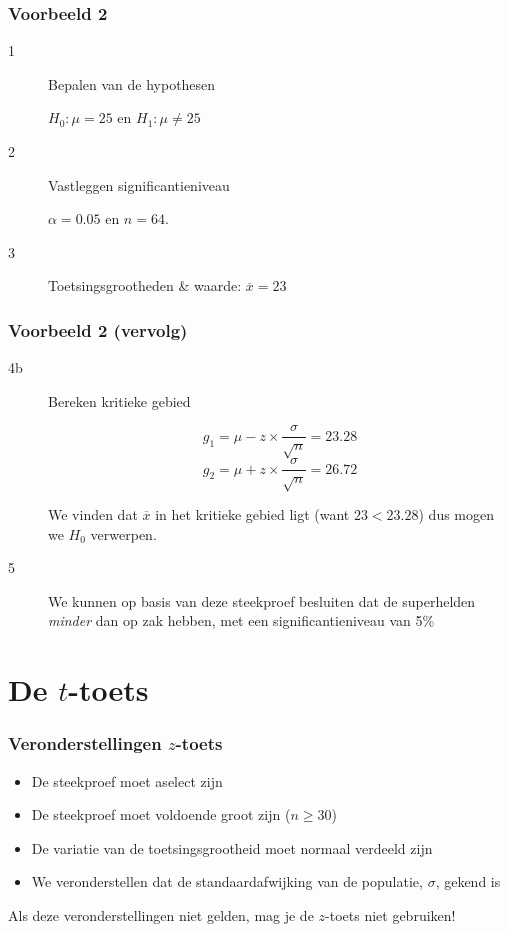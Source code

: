 \documentclass[aspectratio=169]{beamer}
\begin{document}
\begin{frame}
  \frametitle{Voorbeeld 2}
  
  \begin{description}
    \item[1] Bepalen van de hypothesen
    
      $H_{0} : \mu = 25$ en $H_{1}: \mu \neq 25$
      
    \item[2] Vastleggen significantieniveau
    
      $\alpha = 0.05$ en $n=64$.
      
    \item[3] Toetsingsgrootheden \& waarde: $\overline{x} = 23$
  \end{description}
  
\end{frame}

\begin{frame}
\frametitle{Voorbeeld 2 (vervolg)}

  \begin{description}
    \item[4b] Bereken kritieke gebied
    
    \[ g_{1} = \mu - z \times \frac{\sigma}{\sqrt{n}} = 23.28 \]
    \[ g_{2} = \mu + z \times \frac{\sigma}{\sqrt{n}} = 26.72 \]
    
    We vinden dat $\overline{x}$ in het kritieke gebied ligt (want $23 < 23.28$) dus mogen we $H_{0}$ verwerpen.
    \item[5] We kunnen op basis van deze steekproef besluiten dat de superhelden \textit{minder} dan  op zak hebben, met een significantieniveau van 5\%
  \end{description}
\end{frame}

\section{De $t$-toets}

\begin{frame}
  \frametitle{Veronderstellingen $z$-toets}
  
  
  \begin{itemize}
    \item De steekproef moet aselect zijn
    \item De steekproef moet voldoende groot zijn ($n \ge 30$)
    \item De variatie van de toetsingsgrootheid moet normaal verdeeld zijn
    \item We veronderstellen dat de standaardafwijking van de populatie, $\sigma$, gekend is
  \end{itemize}

  Als deze veronderstellingen niet gelden, mag je de $z$-toets niet gebruiken!
\end{frame}
\end{document}
